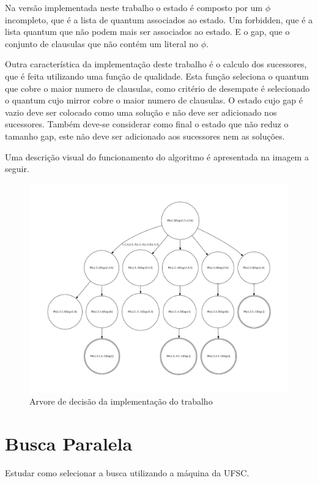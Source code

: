 \documentclass{ufsc-thesis}
\begin{document}
Na versão implementada neste trabalho o estado é composto por um $\phi$ incompleto, que é a lista 
de quantum associados ao estado. Um forbidden, que é a lista quantum que não podem mais ser associados 
ao estado. E o gap, que o conjunto de clausulas que não contém um literal no $\phi$.

Outra característica da implementação deste trabalho é o calculo dos sucessores, que é feita utilizando 
uma função de qualidade. Esta função seleciona o quantum que cobre o maior numero de clausulas, como 
critério de desempate é selecionado o quantum cujo mirror cobre o maior numero de clausulas. O estado cujo 
gap é vazio deve ser colocado como uma solução e não deve ser adicionado nos sucessores. Também deve-se 
considerar como final o estado que não reduz o tamanho gap, este não deve ser adicionado aos sucessores 
nem as soluções.

Uma descrição visual do funcionamento do algoritmo é apresentada na imagem a seguir.

\begin{figure}[H]
    \centering
    \includegraphics[width=1.2\textwidth]{figuras/AlgRep.pdf}
    \caption{Arvore de decisão da implementação do trabalho}
    \label{fig:AlgRep}
\end{figure}

\section{Busca Paralela}

Estudar como selecionar a busca utilizando a máquina da UFSC.



\end{document}
